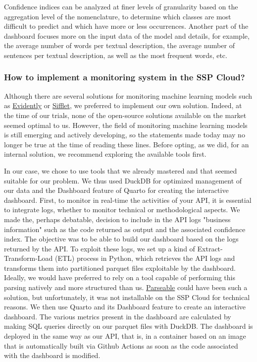 Confidence indices can be analyzed at finer levels of granularity based on the aggregation level of the nomenclature, to determine which classes are most difficult to predict and which have more or less occurrences. Another part of the dashboard focuses more on the input data of the model and details, for example, the average number of words per textual description, the average number of sentences per textual description, as well as the most frequent words, etc.

\subsubsection{How to implement a monitoring system in the SSP Cloud?}

Although there are several solutions for monitoring machine learning models such as \href{https://www.evidentlyai.com/}{Evidently} or \href{https://www.siffletdata.com/}{Sifflet}, we preferred to implement our own solution. Indeed, at the time of our trials, none of the open-source solutions available on the market seemed optimal to us. However, the field of monitoring machine learning models is still emerging and actively developing, so the statements made today may no longer be true at the time of reading these lines. Before opting, as we did, for an internal solution, we recommend exploring the available tools first.

In our case, we chose to use tools that we already mastered and that seemed suitable for our problem. We thus used DuckDB for optimized management of our data and the Dashboard feature of Quarto for creating the interactive dashboard. First, to monitor in real-time the activities of your API, it is essential to integrate logs, whether to monitor technical or methodological aspects. We made the, perhaps debatable, decision to include in the API logs "business information" such as the code returned as output and the associated confidence index. The objective was to be able to build our dashboard based on the logs returned by the API. To exploit these logs, we set up a kind of Extract-Transform-Load (ETL) process in Python, which retrieves the API logs and transforms them into partitioned parquet files exploitable by the dashboard. Ideally, we would have preferred to rely on a tool capable of performing this parsing natively and more structured than us. \href{https://www.parseable.com/}{Parseable} could have been such a solution, but unfortunately, it was not installable on the SSP Cloud for technical reasons. We then use Quarto and its Dashboard feature to create an interactive dashboard. The various metrics present in the dashboard are calculated by making SQL queries directly on our parquet files with DuckDB. The dashboard is deployed in the same way as our API, that is, in a container based on an image that is automatically built via Github Actions as soon as the code associated with the dashboard is modified.

